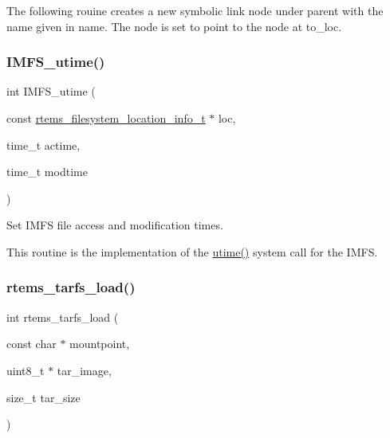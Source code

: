 The following rouine creates a new symbolic link node under parent with the name given in name. The node is set to point to the node at to\+\_\+loc. \mbox{\label{group__IMFS_ga97e0148e68fe08d9dae38257016416c7}} 
\subsubsection{\texorpdfstring{IMFS\_utime()}{IMFS\_utime()}}
{\footnotesize\ttfamily int I\+M\+F\+S\+\_\+utime (\begin{DoxyParamCaption}\item[{const \mbox{\hyperlink{group__LibIO_ga3252b3d31ee3c49ffff0b7604a676864}{rtems\+\_\+filesystem\+\_\+location\+\_\+info\+\_\+t}} $\ast$}]{loc,  }\item[{time\+\_\+t}]{actime,  }\item[{time\+\_\+t}]{modtime }\end{DoxyParamCaption})}



Set I\+M\+FS file access and modification times. 

This routine is the implementation of the \mbox{\hyperlink{utime_8c_ae868610ab18204355b60113d0895586b}{utime()}} system call for the I\+M\+FS. \mbox{\label{group__IMFS_gace6a5eba738dd15b05c48b605e2b0baa}} 
\subsubsection{\texorpdfstring{rtems\_tarfs\_load()}{rtems\_tarfs\_load()}}
{\footnotesize\ttfamily int rtems\+\_\+tarfs\+\_\+load (\begin{DoxyParamCaption}\item[{const char $\ast$}]{mountpoint,  }\item[{uint8\+\_\+t $\ast$}]{tar\+\_\+image,  }\item[{size\+\_\+t}]{tar\+\_\+size }\end{DoxyParamCaption})}



